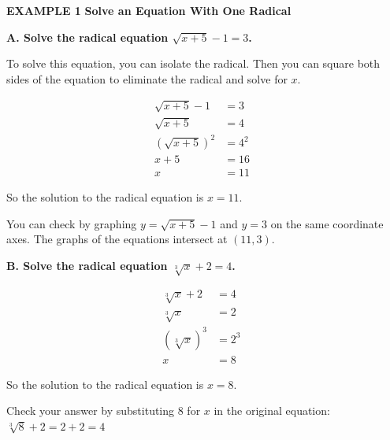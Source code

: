 \documentclass{article}
\newenvironment{example}[1]{\textbf{EXAMPLE #1}\quad}{}
\newcommand{\te}[1]{}
\begin{document}
\begin{example}{1}
\textbf{Solve an Equation With One Radical}

\textbf{A. Solve the radical equation $\sqrt{x + 5} - 1 = 3$.}

To solve this equation, you can isolate the radical. Then you can square both sides of the equation to eliminate the radical and solve for $x$.

\begin{align*}
\sqrt{x + 5} - 1 &= 3 \\
\sqrt{x + 5} &= 4 \quad \text{\te{Square both sides to eliminate the radical.}} \\
(\sqrt{x + 5})^2 &= 4^2 \\
x + 5 &= 16 \\
x &= 11
\end{align*}

So the solution to the radical equation is $x = 11$.

You can check by graphing $y = \sqrt{x + 5} - 1$ and $y = 3$ on the same coordinate axes. The graphs of the equations intersect at $(11, 3)$.

\begin{center}
\end{center}

\textbf{B. Solve the radical equation $\sqrt[3]{x} + 2 = 4$.}

\begin{align*}
\sqrt[3]{x} + 2 &= 4 \\
\sqrt[3]{x} &= 2 \quad \text{\te{Cube both sides to eliminate the cube root.}} \\
(\sqrt[3]{x})^3 &= 2^3 \\
x &= 8
\end{align*}

So the solution to the radical equation is $x = 8$.

Check your answer by substituting 8 for $x$ in the original equation:
$\sqrt[3]{8} + 2 = 2 + 2 = 4$
\end{example}
\end{document}
